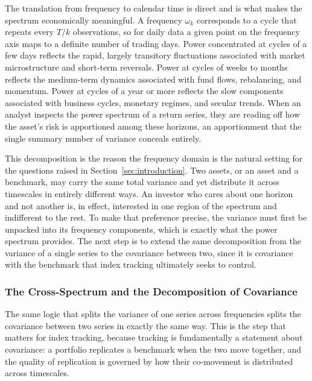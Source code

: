 \documentclass[12pt,a4paper]{article}
\begin{document}
The translation from frequency to calendar time is direct and is what
makes the spectrum economically meaningful. A frequency $\omega_k$
corresponds to a cycle that repeats every $T/k$ observations, so for
daily data a given point on the frequency axis maps to a definite number
of trading days. Power concentrated at cycles of a few days reflects the
rapid, largely transitory fluctuations associated with market
microstructure and short-term reversals. Power at cycles of weeks to
months reflects the medium-term dynamics associated with fund flows,
rebalancing, and momentum. Power at cycles of a year or more reflects the
slow components associated with business cycles, monetary regimes, and
secular trends. When an analyst inspects the power spectrum of a return
series, they are reading off how the asset's risk is apportioned among
these horizons, an apportionment that the single summary number of
variance conceals entirely.

This decomposition is the reason the frequency domain is the natural
setting for the questions raised in Section~\ref{sec:introduction}. Two
assets, or an asset and a benchmark, may carry the same total variance and
yet distribute it across timescales in entirely different ways. An
investor who cares about one horizon and not another is, in effect,
interested in one region of the spectrum and indifferent to the rest. To
make that preference precise, the variance must first be unpacked into its
frequency components, which is exactly what the power spectrum provides.
The next step is to extend the same decomposition from the variance of a
single series to the covariance between two, since it is covariance with
the benchmark that index tracking ultimately seeks to control.

\subsubsection{The Cross-Spectrum and the Decomposition of Covariance}
\label{sec:cross_spectrum}

The same logic that splits the variance of one series across frequencies
splits the covariance between two series in exactly the same way. This is
the step that matters for index tracking, because tracking is
fundamentally a statement about covariance: a portfolio replicates a
benchmark when the two move together, and the quality of replication is
governed by how their co-movement is distributed across timescales.
\end{document}
